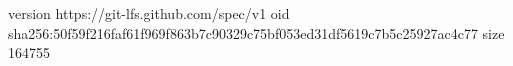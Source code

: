 version https://git-lfs.github.com/spec/v1
oid sha256:50f59f216faf61f969f863b7c90329c75bf053ed31df5619c7b5c25927ac4c77
size 164755
